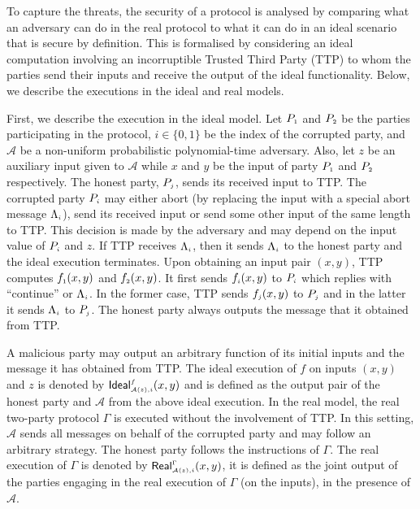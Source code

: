 To capture the threats,
the security of a protocol is analysed by comparing what an adversary can do in the real protocol to what it can do in an ideal scenario that is secure by definition. This is formalised by considering an ideal computation involving an incorruptible Trusted Third Party (TTP) to whom the parties send their inputs and receive the output of the ideal functionality. Below, we describe the executions in the ideal and real models. 
 
First, we describe the execution in the ideal model. Let $P_{\scriptscriptstyle 1}$ and $P_{\scriptscriptstyle 2}$ be the parties participating in the
protocol, $i\in \{0, 1\}$ be the index of the corrupted party, and $\mathcal A$ be a non-uniform
probabilistic polynomial-time adversary. Also, let $z$ be an auxiliary input given to $\mathcal A$ while  $x$ and $y$ be the input of party $P_{\scriptscriptstyle 1}$ and $P_{\scriptscriptstyle 2}$  respectively.  The honest party, $P_{\scriptscriptstyle j}$, sends its received input to TTP.  The corrupted party $P_{\scriptscriptstyle i}$ may either abort (by replacing the input with a special abort message $\Lambda_{\scriptscriptstyle i}$),  send its received input or send some other input of the same length to TTP. This decision is made by the adversary and may depend on the input value of $P_{\scriptscriptstyle i}$ and $z$. If TTP receives $\Lambda_{\scriptscriptstyle i}$, then it sends $\Lambda_{\scriptscriptstyle i}$ to the honest party and the ideal execution terminates.  Upon obtaining an input pair $(x, y)$, TTP computes $f_{\scriptscriptstyle 1}(x, y)$ and $f_{\scriptscriptstyle 2}(x, y)$. It first sends $f_{\scriptscriptstyle i}(x, y)$ to  $P_{\scriptscriptstyle i}$ which replies with ``continue'' or $\Lambda_{\scriptscriptstyle i}$. In the former case, TTP sends  $f_{\scriptscriptstyle j}(x, y)$ to  $P_{\scriptscriptstyle j}$ and in the latter it sends $\Lambda_{\scriptscriptstyle i}$ to  $P_{\scriptscriptstyle j}$. The honest party always outputs the message that it obtained from TTP. 

A malicious party may output an arbitrary function of its initial inputs and the message it has obtained from TTP.  The ideal execution of $f$ on inputs $(x, y)$ and $z$ is denoted by $\mathsf{Ideal}^{\scriptscriptstyle f}_{\scriptscriptstyle\mathcal{A}(z), i}(x,y)$ and is defined as the output pair of the honest party and $\mathcal{A}$ from the above ideal execution.  In the real model, the real two-party protocol $\Gamma$ is executed
without the involvement of TTP. In this setting, $\mathcal{A}$ sends all messages on
behalf of the corrupted party and may follow an arbitrary strategy.
The honest party follows the instructions of $\Gamma$. The real execution of $\Gamma$ is denoted by $\mathsf{Real}^{\scriptscriptstyle \Gamma}_{\scriptscriptstyle\mathcal{A}(z), i}(x,y)$, it is defined as the joint output of the parties engaging in the real execution of $\Gamma$ (on the inputs), in the presence of $\mathcal{A}$.
 
